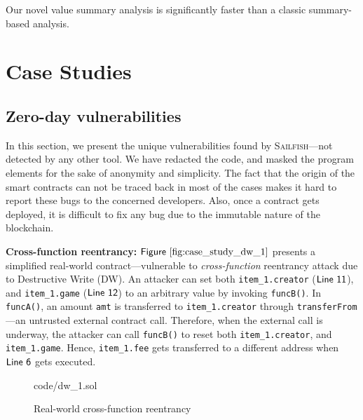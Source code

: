 \documentclass[conference, romanappendices]{tex/IEEEtran}
\theoremstyle{bfnote}
\newcommand{\toolname}{\textsc{Sailfish}\xspace}
\newcommand{\smart}{smart contract}
\newcommand{\reentrancy}{{reentrancy}\xspace}
\newcommand{\Line}[1]{\ensuremath{\sf Line~ #1}}
\newcommand{\Fig}[1]{\ensuremath{\sf Figure~\ref{#1}}}
\begin{document}
\begin{mdframed}[style=graybox]
	Our novel value summary analysis is significantly faster than a classic summary-based analysis.
\end{mdframed}

\section{Case Studies}
\label{app:case_studies}
\subsection{Zero-day vulnerabilities}
\label{sec:case_study_zero_day}
\noindent
In this section, we present the unique vulnerabilities found by \toolname---not detected by any other tool.
We have {redacted\EndAccSupp{}} the code, and masked the program elements for the {sake\EndAccSupp{}} of anonymity and simplicity.
The fact that the origin of the \smart s can not be traced back in most of the cases makes it hard to report these bugs to the concerned developers.
Also, once a contract gets deployed, it is difficult to fix any bug due to the {immutable\EndAccSupp{}} nature of the blockchain.


\noindent
\textbf{Cross-function \reentrancy:}
\Fig{fig:case_study_dw_1} presents a simplified real-world contract---vulnerable to \textit{cross-function} \reentrancy attack due to Destructive Write (DW).
An attacker can set both \texttt{item\_1.creator} (\Line{11}), and \texttt{item\_1.game} (\Line{12}) to an arbitrary value by invoking \texttt{funcB()}.
In \texttt{funcA()}, an amount \texttt{amt} is transferred to \texttt{item\_1.creator} through \texttt{transferFrom}---an untrusted external contract call.
Therefore, when the external call is underway, the attacker can call \texttt{funcB()} to reset both \texttt{item\_1.creator}, and \texttt{item\_1.game}.
Hence, \texttt{item\_1.fee} gets transferred to a different address when \Line{6} gets executed.

\begin{figure}[h]
	\vspace{-5mm}
	
	{code/dw_1.sol}
	\vspace{-7mm}
	\caption{Real-world cross-function \reentrancy
	}
	\label{fig:case_study_dw_1}
	\vspace{-3mm}
\end{figure}
\end{document}
